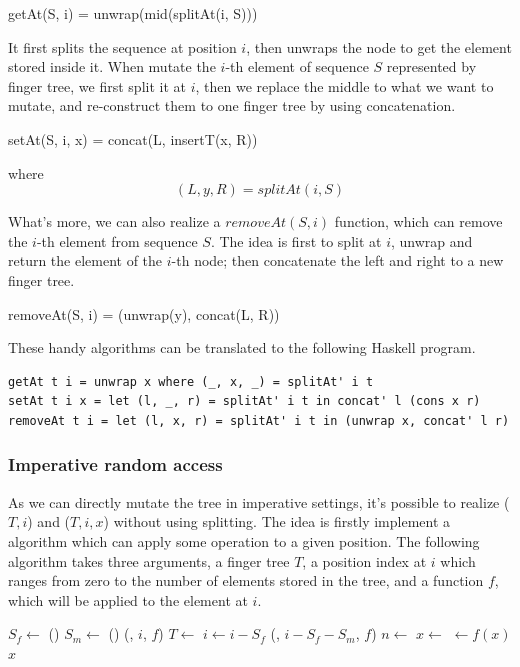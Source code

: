 \documentclass[b5paper]{article}
\begin{document}
\be
getAt(S, i) = unwrap(mid(splitAt(i, S)))
\ee

It first splits the sequence at position $i$, then unwraps the node to get the element
stored inside it. When mutate the $i$-th element of sequence $S$ represented by finger tree,
we first split it at $i$, then we replace the middle to what
we want to mutate, and re-construct them to one finger tree by using concatenation.

\be
setAt(S, i, x) = concat(L, insertT(x, R))
\ee

where
\[
(L, y, R) = splitAt(i, S)
\]

What's more, we can also realize a $removeAt(S, i)$ function, which can remove the
$i$-th element from sequence $S$. The idea is first to split at $i$, unwrap and
return the element of the $i$-th node; then concatenate the left and right to a
new finger tree.

\be
removeAt(S, i) = (unwrap(y), concat(L, R))
\ee

These handy algorithms can be translated to the following Haskell program.

\lstset{language=Haskell}
\begin{lstlisting}
getAt t i = unwrap x where (_, x, _) = splitAt' i t
setAt t i x = let (l, _, r) = splitAt' i t in concat' l (cons x r)
removeAt t i = let (l, x, r) = splitAt' i t in (unwrap x, concat' l r)
\end{lstlisting}

\subsubsection{Imperative random access}
As we can directly mutate the tree in imperative settings, it's possible to
realize ($T, i$) and ($T, i, x$) without
using splitting. The idea is firstly implement a algorithm which can
apply some operation to a given position. The following algorithm takes
three arguments, a finger tree $T$, a position index at $i$ which ranges from
zero to the number of elements stored in the tree, and a function $f$,
which will be applied to the element at $i$.

\begin{algorithmic}
    \State $S_f \gets $ ()
    \State $S_m \gets $ ()
      \State \Return {}(, $i$, $f$)
      \State $T \gets$ 
      \State $i \gets i - S_f$
    \Else
      \State \Return {}(, $i - S_f - S_m$, $f$)
    \EndIf
  \EndWhile
  \State $n \gets$ 
  \State $x \gets$ 
  \State {} $\gets f(x)$
  \State \Return $x$
\EndFunction
\end{algorithmic}
\end{document}
